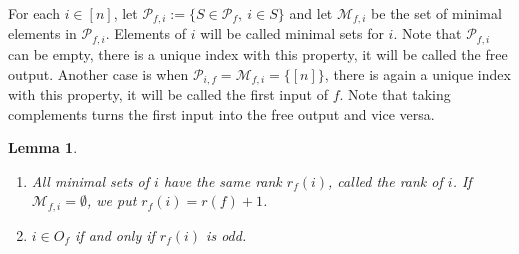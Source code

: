 \documentclass[12pt]{article}
\newtheorem{lemma}{Lemma}
\theoremstyle{definition}
\theoremstyle{remark}
\def\Pe{\mathcal P}
\begin{document}
For each $i\in [n]$, let $\Pe_{f,i}:=\{S\in \Pe_f,\ i\in S\}$ and let $\mathcal M_{f,i}$ be the
set of minimal elements in $\Pe_{f,i}$. Elements of $i$ will be called minimal sets for
$i$. Note that $\Pe_{f,i}$ can be empty, there is a unique index with this property, it
will be called the free output. 
Another case is when $\Pe_{i,f}=\mathcal M_{f,i}=\{[n]\}$, there is again a unique index with this
property, it will be called the first input of $f$. Note that taking complements turns the
first input into the free output and vice versa.


\begin{lemma}\label{lemma:points} 
\begin{enumerate}
\item[(i)]  All minimal sets of $i$ have the same rank $r_f(i)$, called the rank of $i$. If
$\mathcal M_{f,i}=\emptyset$, we put $r_f(i)=r(f)+1$. 
\item[(ii)] $i\in O_f$ if and only if $r_f(i)$ is odd.

\end{enumerate}


\end{lemma}
\end{document}
